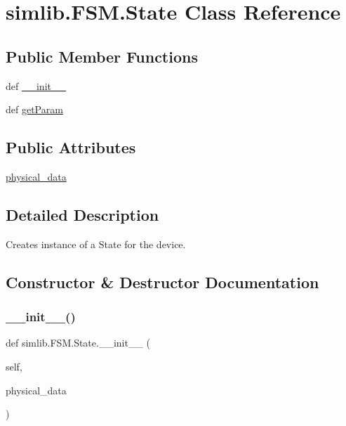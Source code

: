 \hypertarget{classsimlib_1_1_f_s_m_1_1_state}{}\section{simlib.\+F\+S\+M.\+State Class Reference}
\label{classsimlib_1_1_f_s_m_1_1_state}
\subsection*{Public Member Functions}
\begin{DoxyCompactItemize}
\item 
def \mbox{\hyperlink{classsimlib_1_1_f_s_m_1_1_state_a29b361fb27793289b8e476b6fd927ae5}{\+\_\+\+\_\+init\+\_\+\+\_\+}}
\item 
def \mbox{\hyperlink{classsimlib_1_1_f_s_m_1_1_state_a92eddcb3c69993196174f4626ac01cb6}{get\+Param}}
\end{DoxyCompactItemize}
\subsection*{Public Attributes}
\begin{DoxyCompactItemize}
\item 
\mbox{\hyperlink{classsimlib_1_1_f_s_m_1_1_state_ad26863e22f2f1f410b06d09d118cf340}{physical\+\_\+data}}
\end{DoxyCompactItemize}


\subsection{Detailed Description}
\begin{DoxyVerb}Creates instance of a State for the device.
\end{DoxyVerb}
 

\subsection{Constructor \& Destructor Documentation}
\mbox{\label{classsimlib_1_1_f_s_m_1_1_state_a29b361fb27793289b8e476b6fd927ae5}} 
\subsubsection{\texorpdfstring{\+\_\+\+\_\+init\+\_\+\+\_\+()}{\_\_init\_\_()}}
{\footnotesize\ttfamily def simlib.\+F\+S\+M.\+State.\+\_\+\+\_\+init\+\_\+\+\_\+ (\begin{DoxyParamCaption}\item[{}]{self,  }\item[{}]{physical\+\_\+data }\end{DoxyParamCaption})}



